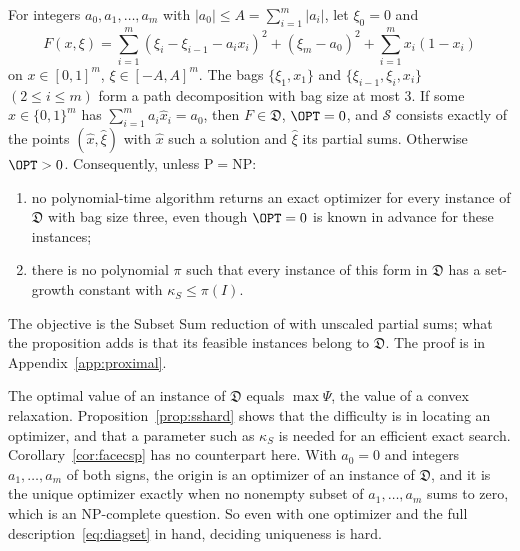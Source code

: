 \begin{proposition}\label{prop:sshard}
For integers $a_0,a_1,\ldots,a_m$ with $|a_0|\le A=\sum_{i=1}^m|a_i|$, let
$\xi_0=0$ and
\[
F(x,\xi)=\sum_{i=1}^m(\xi_i-\xi_{i-1}-a_ix_i)^2+(\xi_m-a_0)^2
+\sum_{i=1}^mx_i(1-x_i)
\]
on $x\in[0,1]^m$, $\xi\in[-A,A]^m$. The bags $\{\xi_1,x_1\}$ and
$\{\xi_{i-1},\xi_i,x_i\}$ $(2\le i\le m)$ form a path decomposition with bag
size at most $3$. If some $\hat x\in\{0,1\}^m$ has $\sum_{i=1}^ma_i\hat x_i=a_0$, then
$F\in\mathfrak D$, $\OPT=0$, and $\mathcal S$ consists exactly of the points
$(\hat x,\hat\xi)$ with $\hat x$ such a solution and $\hat\xi$ its partial
sums. Otherwise $\OPT>0$. Consequently, unless $\mathrm P=\mathrm{NP}$:
\begin{enumerate}[label=(\roman*)]
\item no polynomial-time algorithm returns an exact optimizer for every
instance of $\mathfrak D$ with bag size three, even though $\OPT=0$ is known
in advance for these instances;
\item there is no polynomial $\pi$ such that every instance of this form in
$\mathfrak D$ has a set-growth constant with $\kappa_S\le\pi(I)$.
\end{enumerate}
\end{proposition}

The objective is the Subset Sum reduction of
\cite[Remark~2]{DelPiaKhajavirad2026} with unscaled partial sums; what the
proposition adds is that its feasible instances belong to $\mathfrak D$. The
proof is in Appendix~\ref{app:proximal}.

The optimal value of an instance of $\mathfrak D$ equals $\max\Psi$, the
value of a convex relaxation. Proposition~\ref{prop:sshard} shows that the
difficulty is in locating an optimizer, and that a parameter such as
$\kappa_S$ is needed for an efficient exact search.
Corollary~\ref{cor:facecsp} has no counterpart here. With $a_0=0$ and
integers $a_1,\ldots,a_m$ of both signs, the origin is an optimizer of an
instance of $\mathfrak D$, and it is the unique optimizer exactly when no
nonempty subset of $a_1,\ldots,a_m$ sums to zero, which is an NP-complete
question. So even with one optimizer and the full
description~\eqref{eq:diagset} in hand, deciding uniqueness is hard.
